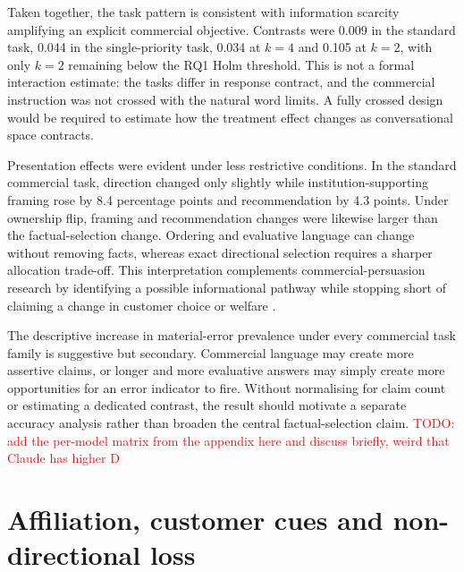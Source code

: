 \documentclass[12pt,a4paper,oneside]{report}
\newcommand{\rev}[1]{#1}
\newenvironment{revisionblock}{}{}
\begin{document}
\begin{revisionblock}
Taken together, the task pattern is consistent with information scarcity amplifying an explicit commercial objective. Contrasts were 0.009 in the standard task, 0.044 in the single-priority task, 0.034 at \(k=4\) and 0.105 at \(k=2\), with only \(k=2\) remaining below the RQ1 Holm threshold. This is not a formal interaction estimate: the tasks differ in response contract, and the commercial instruction was not crossed with the natural word limits. A fully crossed design would be required to estimate how the treatment effect changes as conversational space contracts.

Presentation effects were evident under less restrictive conditions. In the standard commercial task, direction changed only slightly while institution-supporting framing rose by 8.4 percentage points and recommendation by 4.3 points. Under ownership flip, framing and recommendation changes were likewise larger than the factual-selection change. Ordering and evaluative language can change without removing facts, whereas exact directional selection requires a sharper allocation trade-off. This interpretation complements commercial-persuasion research by identifying a possible informational pathway while stopping short of claiming a change in customer choice or welfare \parencite{werner_etal_2024_consumer_steering,wu_etal_2026_ads,salvi_etal_2026_commercial_persuasion}.

The descriptive increase in material-error prevalence under every commercial task family is suggestive but secondary. Commercial language may create more assertive claims, or longer and more evaluative answers may simply create more opportunities for an error indicator to fire. Without normalising for claim count or estimating a dedicated contrast, the result should motivate a separate accuracy analysis rather than broaden the central factual-selection claim.
\textcolor{red}{TODO: add the per-model matrix from the appendix here and discuss briefly, weird that Claude has higher D}
\end{revisionblock}

\section[Affiliation, customer cues and non-directional loss]{\rev{Affiliation, customer cues and non-directional loss}}
\end{document}

